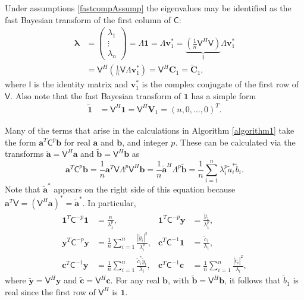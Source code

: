 \documentclass{svjour3}                     %
\newcommand{\bm}[1]{\boldsymbol{#1}}
\newcommand{\vlambda}{{\bm{\lambda}}}
\newcommand{\va}{\bm{a}}
\newcommand{\vb}{\bm{b}}
\newcommand{\vc}{\bm{c}}
\newcommand{\vC}{\bm{C}}
\newcommand{\vv}{\bm{v}}
\newcommand{\vV}{\bm{V}}
\newcommand{\vy}{\bm{y}}
\newcommand{\vone}{\bm{1}}
\newcommand{\mC}{\mathsf{C}}
\newcommand{\mCInv}{\mathsf{C}^{-1}}
\newcommand{\mLambda}{\mathsf{\Lambda}}
\newcommand{\mV}{\mathsf{V}}
\def\abs#1{\ensuremath{\left \lvert #1 \right \rvert}}
\begin{document}
Under assumptions \eqref{fastcompAssump} the eigenvalues may be identified as the fast Bayesian transform of the first column of $\mC$:
\begin{align}
\nonumber
\vlambda 
& = \begin{pmatrix}
\lambda_1 \\ \vdots \\ \lambda_n
\end{pmatrix} = \mLambda \vone = \mLambda \vv_1^* 
= \underbrace{\left( \frac 1n \mV^H  \mV \right) }_{\mathsf{I}} \mLambda \vv_1^* \\
&= \mV^H \left( \frac 1n \mV \mLambda \vv_1^* \right)
= \mV^H \vC_1 =  \widetilde{\vC}_1,
\label{eqn:fast_transform_to_eigvalues}
\end{align}
where $\mathsf{I}$ is the identity matrix and $\vv_1^*$ is the complex conjugate of the first row of $\mV$.
Also note that the fast Bayesian transform of $\vone$ has a simple form
\begin{align*} 
\widetilde{\vone}
& = \mV^H \vone = \mV^H \vV_1 = 
\left(n, 0, \dots, 0 \right)^T.
\label{eqn:fast_transform_one}
\end{align*}

Many of the terms that arise in the calculations in  Algorithm \ref{algorithm1} take the form $\va^T\mC^{p}\vb$ for real $\va$ and $\vb$, and integer $p$.  These can be calculated via the transforms $\widetilde{\va} = \mV^H \va$ and $\widetilde{\vb} = \mV^H \vb$ as 
\begin{equation*}
\va^T\mC^p\vb = \frac 1n \va^T \mV \mLambda^p \mV^H \vb
= \frac 1n \widetilde{\va}^H\mLambda^p \widetilde{\vb}
= \frac 1n \sum_{i=1}^n \lambda_i^p \widetilde{a}_i^* \widetilde{b}_i.
\end{equation*}
Note that $\widetilde{\va}^*$ appears on the right side of this equation because $\va^T \mV = (\mV^H \va)^* = \widetilde{\va}^*$.  In particular,
\begin{align*}
\vone^T\mC^{-p}\vone & = \frac{n}{\lambda_1^p},
&
\vone^T\mC^{-p}\vy &= \frac{\widetilde{y}_1}{\lambda_1^p},
\\
\vy^T\mC^{-p} \vy &= \frac 1n \sum_{i=1}^n \frac{\abs{\widetilde{y}_i}^2}{\lambda_i^p},
&
\vc^T\mCInv \vone &= \frac{\widetilde{c}_1}{\lambda_1},\\
\vc^T\mCInv \vy &= \frac 1n \sum_{i=1}^n \frac{\widetilde{c}_i^* \widetilde{y}_i}{\lambda_i}, & 
\vc^T\mCInv \vc &= \frac 1n \sum_{i=1}^n \frac{\abs{\widetilde{c}_i}^2}{\lambda_i},
\end{align*}
where $\widetilde{\vy} = \mV^H \vy$ and 
$\widetilde{\vc} = \mV^H \vc$.  For any real $\vb$, with $\widetilde{\vb} = \mV^H\vb$, it follows that $\widetilde{b}_1$ is real since the first row of $\mV^H$ is $\vone$.
\end{document}
